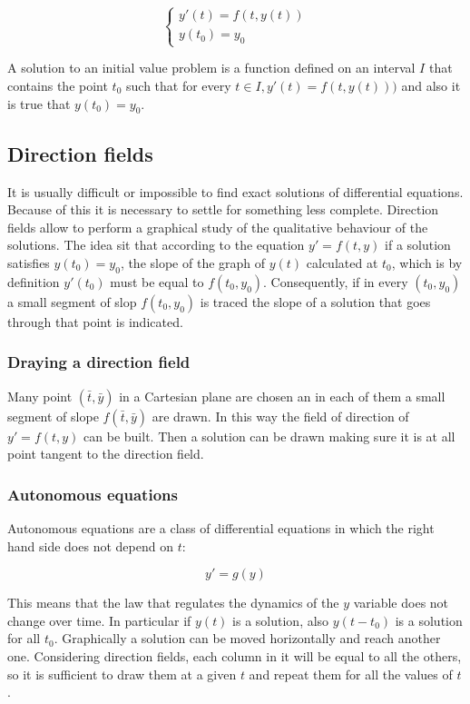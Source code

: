 		$$\begin{cases} y'(t) = f(t,y(t))\\y(t_0) = y_0\end{cases}$$

		A solution to an initial value problem is a function defined on an interval $I$ that contains the point $t_0$ such that for every $t\in I, y'(t) = f(t, y(t)))$ and also it is true that $y(t_0) = y_0$.

	\subsection{Direction fields}
	It is usually difficult or impossible to find exact solutions of differential equations.
	Because of this it is necessary to settle for something less complete.
	Direction fields allow to perform a graphical study of the qualitative behaviour of the solutions.
	The idea sit that according to the equation $y'=f(t,y)$ if a solution satisfies $y(t_0) = y_0$, the slope of the graph of $y(t)$ calculated at $t_0$, which is by definition $y'(t_0)$ must be equal to $f(t_0, y_0)$.
	Consequently, if in every $(t_0, y_0)$ a small segment of slop $f(t_0, y_0)$ is traced the slope of a solution that goes through that point is indicated.

		\subsubsection{Draying a direction field}
		Many point $(\bar{t}, \bar{y})$ in a Cartesian plane are chosen an in each of them a small segment of slope $f(\bar{t}, \bar{y})$ are drawn.
		In this way the field of direction of $y' = f(t, y)$ can be built.
		Then a solution can be drawn making sure it is at all point tangent to the direction field.

		\subsubsection{Autonomous equations}
		Autonomous equations are a class of differential equations in which the right hand side does not depend on $t$:

		$$y' = g(y)$$

		This means that the law that regulates the dynamics of the $y$ variable does not change over time.
		In particular if $y(t)$ is a solution, also $y(t-t_0)$ is a solution for all $t_0$.
		Graphically a solution can be moved horizontally and reach another one.
		Considering direction fields, each column in it will be equal to all the others, so it is sufficient to draw them at a given $t$ and repeat them for all the values of $t$.

